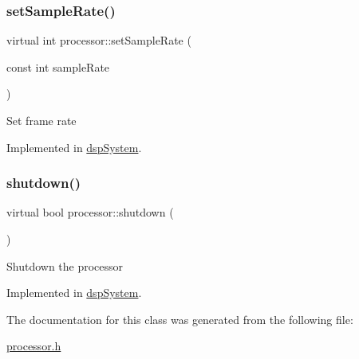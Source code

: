 \subsubsection{\texorpdfstring{set\+Sample\+Rate()}{setSampleRate()}}
{\footnotesize\ttfamily virtual int processor\+::set\+Sample\+Rate (\begin{DoxyParamCaption}\item[{const int}]{sample\+Rate }\end{DoxyParamCaption})\hspace{0.3cm}{\ttfamily [pure virtual]}}

Set frame rate 

Implemented in \hyperlink{classdspSystem_ac6fe7760ea257a9763556752f2017120}{dsp\+System}.

\mbox{\label{classprocessor_aad3c0afc61e81dbf9cce91d358dca0bd}} 
\subsubsection{\texorpdfstring{shutdown()}{shutdown()}}
{\footnotesize\ttfamily virtual bool processor\+::shutdown (\begin{DoxyParamCaption}{ }\end{DoxyParamCaption})\hspace{0.3cm}{\ttfamily [pure virtual]}}

Shutdown the processor 

Implemented in \hyperlink{classdspSystem_aaeee5d8676285bbb2402739edabe5d09}{dsp\+System}.



The documentation for this class was generated from the following file\+:\begin{DoxyCompactItemize}
\item 
\hyperlink{processor_8h}{processor.\+h}\end{DoxyCompactItemize}

